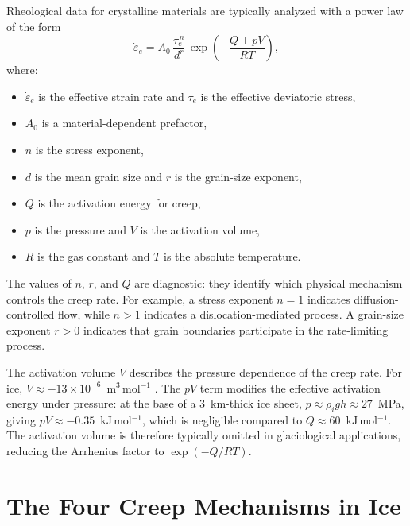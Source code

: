 \documentclass[11pt]{article}
\begin{document}
Rheological data for crystalline materials are typically analyzed with a power law of the form
\begin{equation}
  \boxed{\dot{\varepsilon}_e = A_0 \,\frac{\tau_e^{\,n}}{d^r} \,\exp\!\left(-\frac{Q + pV}{RT}\right),}
  \label{eq:general_creep}
\end{equation}
where:
\begin{itemize}
  \item $\dot{\varepsilon}_e$ is the effective strain rate and $\tau_e$ is the effective deviatoric stress,
  \item $A_0$ is a material-dependent prefactor,
  \item $n$ is the stress exponent,
  \item $d$ is the mean grain size and $r$ is the grain-size exponent,
  \item $Q$ is the activation energy for creep,
  \item $p$ is the pressure and $V$ is the activation volume,
  \item $R$ is the gas constant and $T$ is the absolute temperature.
\end{itemize}

\noindent The values of $n$, $r$, and $Q$ are diagnostic: they identify which physical mechanism controls the creep rate.  For example, a stress exponent $n = 1$ indicates diffusion-controlled flow, while $n > 1$ indicates a dislocation-mediated process.  A grain-size exponent $r > 0$ indicates that grain boundaries participate in the rate-limiting process.

\medskip
\noindent The activation volume $V$ describes the pressure dependence of the creep rate.  For ice, $V \approx -13 \times 10^{-6}$~m$^3$\,mol$^{-1}$ \cite{GoldsbyKohlstedt2001}.  The $pV$ term modifies the effective activation energy under pressure: at the base of a 3~km-thick ice sheet, $p \approx \rho_i g h \approx 27$~MPa, giving $pV \approx -0.35$~kJ\,mol$^{-1}$, which is negligible compared to $Q \approx 60$~kJ\,mol$^{-1}$.  The activation volume is therefore typically omitted in glaciological applications, reducing the Arrhenius factor to $\exp(-Q/RT)$.

\section{The Four Creep Mechanisms in Ice}
\label{sec:creep_mechanisms}
\end{document}
